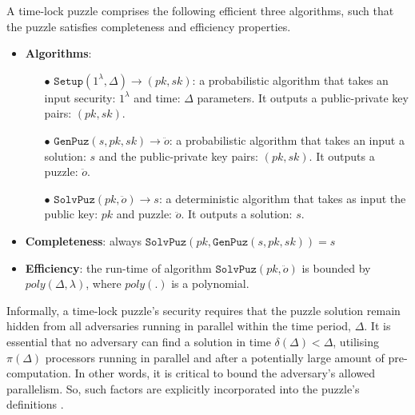 \begin{definition}\label{Def::Time-lock-Puzzle} A time-lock puzzle comprises the following efficient three algorithms, such that the puzzle satisfies completeness and efficiency properties. 
\begin{itemize}[leftmargin=.37cm]
\item \textbf{Algorithms}:
\begin{itemize}
\item[$\bullet$]$\mathtt{Setup}(1^{\scriptscriptstyle\lambda},\Delta)\rightarrow (pk,sk)$: a probabilistic algorithm that takes an input  security: $1^{\scriptscriptstyle\lambda}$ and time:  $\Delta$ parameters. It outputs a public-private key pairs: $(pk,sk)$. 

\item[$\bullet$]$\mathtt{GenPuz}(s, pk, sk)\rightarrow \ddot{o}$: a probabilistic algorithm that takes an input a solution: $s$ and the public-private key pairs: $(pk,sk)$. It  outputs a puzzle: $\ddot{o}$.

\item[$\bullet$]$\mathtt{SolvPuz}(pk,\ddot{o})\rightarrow s$:  a deterministic algorithm that takes as input  the public key: $pk$ and  puzzle: $\ddot{o}$. It outputs a solution: $s$. 
\end{itemize}
\item \textbf{Completeness}: always  $\mathtt{SolvPuz}(pk,\mathtt{GenPuz}(s,pk,sk))=s$


\item \textbf{Efficiency}: the run-time of algorithm $\mathtt{SolvPuz}(pk,\ddot{o})$ is bounded by  $poly(\Delta,\lambda)$, where $poly(.)$ is a  polynomial.
\end{itemize}
\end{definition}


Informally, a time-lock puzzle's security requires that the puzzle solution  remain hidden from all adversaries running in parallel within the time period, $\Delta$.   It is essential that no adversary can find a solution   in  time $\delta(\Delta)<\Delta$, utilising  $\pi(\Delta)$  processors running in parallel and after a potentially large amount of pre-computation. In other words, it is critical to bound the adversary's allowed parallelism. So, such factors are explicitly incorporated  into the puzzle's definitions \cite{BonehBBF18,MalavoltaT19,garay2019}. 

